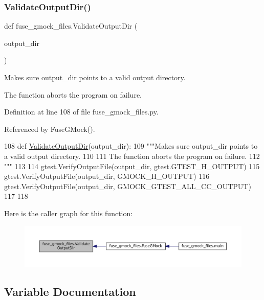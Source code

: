 \subsubsection{\texorpdfstring{Validate\+Output\+Dir()}{ValidateOutputDir()}}
{\footnotesize\ttfamily def fuse\+\_\+gmock\+\_\+files.\+Validate\+Output\+Dir (\begin{DoxyParamCaption}\item[{}]{output\+\_\+dir }\end{DoxyParamCaption})}

\begin{DoxyVerb}Makes sure output_dir points to a valid output directory.

The function aborts the program on failure.
\end{DoxyVerb}
 

Definition at line 108 of file fuse\+\_\+gmock\+\_\+files.\+py.



Referenced by Fuse\+G\+Mock().


\begin{DoxyCode}
108 \textcolor{keyword}{def }\hyperlink{namespacefuse__gmock__files_a68581e210793099d656537faa719df29}{ValidateOutputDir}(output\_dir):
109   \textcolor{stringliteral}{"""Makes sure output\_dir points to a valid output directory.}
110 \textcolor{stringliteral}{}
111 \textcolor{stringliteral}{  The function aborts the program on failure.}
112 \textcolor{stringliteral}{  """}
113 
114   gtest.VerifyOutputFile(output\_dir, gtest.GTEST\_H\_OUTPUT)
115   gtest.VerifyOutputFile(output\_dir, GMOCK\_H\_OUTPUT)
116   gtest.VerifyOutputFile(output\_dir, GMOCK\_GTEST\_ALL\_CC\_OUTPUT)
117 
118 
\end{DoxyCode}
Here is the caller graph for this function\+:
\nopagebreak
\begin{figure}[H]
\begin{center}
\leavevmode
\includegraphics[width=350pt]{namespacefuse__gmock__files_a68581e210793099d656537faa719df29_icgraph}
\end{center}
\end{figure}


\subsection{Variable Documentation}
\mbox{\label{namespacefuse__gmock__files_abbec91475e2948cd4528a04cc3b19d18}} 
